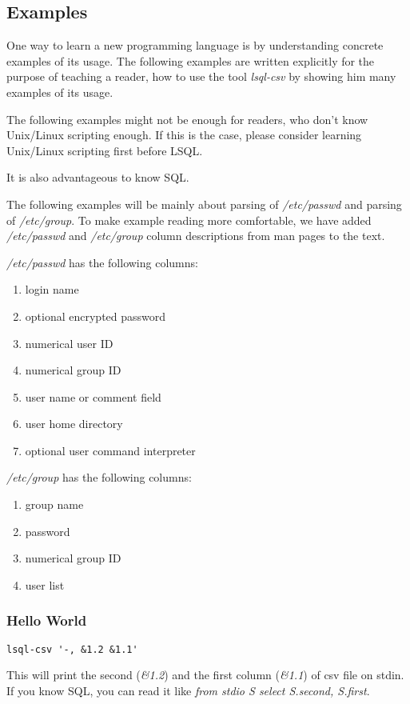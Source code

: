 \subsection{Examples}
One way to learn a new programming language is by understanding concrete examples of its usage. The following examples are written explicitly for the purpose of teaching a reader, how to use the tool \textit{lsql-csv} by showing him many examples of its usage.

The following examples might not be enough for readers, who don't know Unix/Linux scripting enough. If this is the case, please consider learning Unix/\-Linux scripting first before LSQL.

It is also advantageous to know SQL.

The following examples will be mainly about parsing of \textit{/etc/passwd} and parsing of \textit{/etc/group}. To make example reading more comfortable, we have added \textit{/etc/passwd} and \textit{/etc/group} column descriptions from man pages to the text.

\textit{/etc/passwd} has the following columns\cite{passwd}:
\begin{enumerate}
    \item login name
    \item optional encrypted password
    \item numerical user ID    
    \item numerical group ID    
    \item user name or comment field
    \item user home directory
    \item optional user command interpreter
\end{enumerate}
\textit{/etc/group} has the following columns\cite{group}:
\begin{enumerate}
    \item group name
    \item password
    \item numerical group ID
    \item user list
\end{enumerate}


\subsubsection{Hello World}
\begin{verbatim}
lsql-csv '-, &1.2 &1.1'
\end{verbatim}
This will print the second (\textit{\&1.2}) and the first column (\textit{\&1.1}) of csv file on stdin. If you know SQL, you can read it like \textit{from stdio S select S.second, S.first}.

